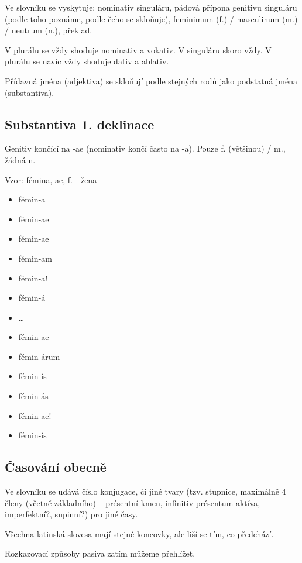 \documentclass[12pt]{article}					%
\begin{document}
        Ve slovníku se vyskytuje: nominativ singuláru, pádová přípona genitivu singuláru (podle toho poznáme, podle čeho se skloňuje), feminimum (f.) / masculinum (m.) / neutrum (n.), překlad.

        V plurálu se vždy shoduje nominativ a vokativ. V singuláru skoro vždy. V plurálu se navíc vždy shoduje dativ a ablativ.

        Přídavná jména (adjektiva) se skloňují podle stejných rodů jako podstatná jména (substantiva).

    \subsection{Substantiva 1. deklinace}
        Genitiv končící na -ae (nominativ končí často na -a). Pouze f. (většinou) / m., žádná n.

        Vzor: fémina, ae, f. - žena
        \begin{itemize}
            \item fémin-a
            \item fémin-ae
            \item fémin-ae
            \item fémin-am
            \item fémin-a!
            \item fémin-á
            \item …
            \item fémin-ae
            \item fémin-árum
            \item fémin-ís
            \item fémin-ás
            \item fémin-ae!
            \item fémin-ís
        \end{itemize}


    \subsection{Časování obecně}
        Ve slovníku se udává číslo konjugace, či jiné tvary (tzv. stupnice, maximálně 4 členy (včetně základního) -- présentní kmen, infinitiv présentum aktíva, imperfektní?, supinní?) pro jiné časy.

        Všechna latinská slovesa mají stejné koncovky, ale liší se tím, co předchází.

        Rozkazovací způsoby pasiva zatím můžeme přehlížet.
\end{document}
